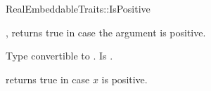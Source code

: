 \begin{ccRefFunctionObjectConcept}{RealEmbeddableTraits::IsPositive}

\ccDefinition

, returns true in case the argument is positive.  
 
\ccRefines 



\ccTypes
{} 
        { Type convertible to .}
        { Is .}

\ccOperations
{}

        { returns true in case $x$ is positive. }


\ccSeeAlso

\\

\end{ccRefFunctionObjectConcept} 